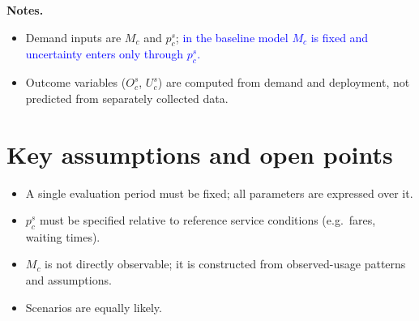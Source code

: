 \documentclass[10pt,a4paper]{article}
\begin{document}
\textbf{Notes.}
\begin{itemize}[leftmargin=*,itemsep=1pt]
  \item Demand inputs are $M_c$ and $p_c^s$; \textcolor{blue}{in the baseline model $M_c$ is fixed and
        uncertainty enters only through $p_c^s$.}
  \item Outcome variables ($O_c^s$, $U_c^s$) are computed from demand and deployment,
        not predicted from separately collected data.
\end{itemize}


\section{Key assumptions and open points}
\begin{itemize}[leftmargin=*,itemsep=1pt]
  \item A single evaluation period must be fixed; all parameters are expressed over it.
  \item $p_c^s$ must be specified relative to reference service conditions (e.g.\ fares, waiting times).
  \item $M_c$ is not directly observable; it is constructed from observed-usage patterns and assumptions.
  \item Scenarios are equally likely.
\end{itemize}
\end{document}
